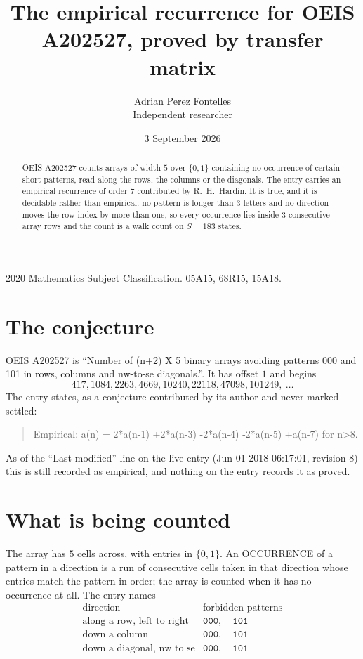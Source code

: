 \documentclass[11pt,a4paper]{article}
\title{The empirical recurrence for OEIS A202527, proved by transfer matrix}
\author{Adrian Perez Fontelles\\ \small Independent researcher}
\date{3 September 2026}
\theoremstyle{plain}
\theoremstyle{definition}
\begin{document}
\maketitle

\begin{abstract}
OEIS A202527 counts arrays of width $5$ over $\{0,1\}$ containing no occurrence of certain short
patterns, read along the rows, the columns or the diagonals. The entry carries an empirical
recurrence of order $7$ contributed by R.~H.~Hardin. It is true, and it is decidable
rather than empirical: no pattern is longer than $3$ letters and no direction moves the row
index by more than one, so every occurrence lies inside $3$ consecutive array rows and the
count is a walk count on $S=183$ states.
\end{abstract}

\noindent\small 2020 Mathematics Subject Classification. 05A15, 68R15, 15A18.\normalsize

\section{The conjecture}

OEIS A202527 is ``Number of (n+2) X 5 binary arrays avoiding patterns 000 and 101 in rows, columns and nw-to-se diagonals.''. It has offset $1$ and begins
\[
417, 1084, 2263, 4669, 10240, 22118, 47098, 101249,\ \dots
\]
The entry states, as a conjecture contributed by its author and never marked settled:
\begin{quote}
Empirical: a(n) = 2*a(n-1) +2*a(n-3) -2*a(n-4) -2*a(n-5) +a(n-7) for n>8.
\end{quote}
As of the ``Last modified'' line on the live entry (Jun 01 2018 06:17:01, revision 8) this is still
recorded as empirical, and nothing on the entry records it as proved.

\section{What is being counted}

The array has $5$ cells across, with entries in $\{0,1\}$. An OCCURRENCE of a pattern in a
direction is a run of consecutive cells taken in that direction whose entries match the pattern
in order; the array is counted when it has no occurrence at all. The entry names
\[
\begin{array}{ll}
\text{direction} & \text{forbidden patterns} \\[2pt]
\text{along a row, left to right} & \mathtt{000},\quad \mathtt{101} \\
\text{down a column} & \mathtt{000},\quad \mathtt{101} \\
\text{down a diagonal, nw to se} & \mathtt{000},\quad \mathtt{101} \\
\end{array}
\]
\end{document}
